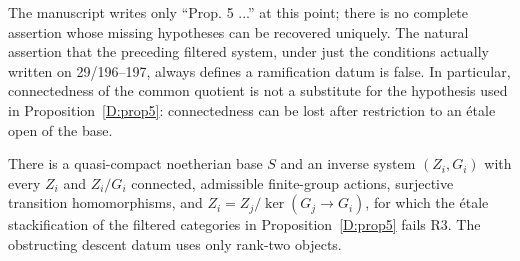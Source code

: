 The manuscript writes only ``Prop. 5 ...'' at this point; there is no
complete assertion whose missing hypotheses can be recovered uniquely.
The natural assertion that the preceding filtered system, under just
the conditions actually written on 29/196--197, always defines a
ramification datum is false. In particular, connectedness of the
common quotient is not a substitute for the hypothesis used in
Proposition~\ref{D:prop5}: connectedness can be lost after restriction
to an \'etale open of the base.

\begin{example}
\label{D:prop5-counterexample}
There is a quasi-compact noetherian base $S$ and an inverse system
$(Z_i,G_i)$ with every $Z_i$ and $Z_i/G_i$ connected, admissible
finite-group actions, surjective transition homomorphisms, and
$Z_i=Z_j/\ker(G_j\to G_i)$, for which the \'etale stackification
of the filtered categories in Proposition~\ref{D:prop5} fails R3.
The obstructing descent datum uses only rank-two objects.
\end{example}
